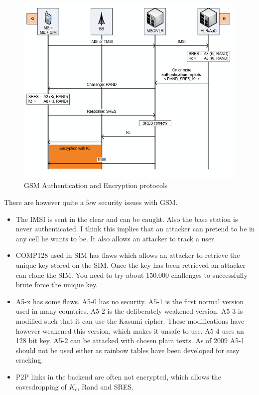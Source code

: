 \documentclass{article}
\begin{document}
\begin{figure}[!h]
\centering
\includegraphics[width=\textwidth, height=\textheight, keepaspectratio]{images/gsm_auth_enc.png}
\caption{GSM Authentication and Encryption protocols}
\label{fig:gsm_auth_enc}
\end{figure}

There are however quite a few security issues with GSM.

\begin{itemize}
\item The IMSI is sent in the clear and can be caught. Also the base station is never authenticated. I think this implies that an attacker can pretend to be in any cell he wants to be. It also allows an attacker to track a user.
\item COMP128 used in SIM has flaws which allows an attacker to retrieve the unique key stored on the SIM. Once the key has been retrieved an attacker can clone the SIM. You need to try about 150.000 challenges to successfully brute force the unique key.
\item A5-x has some flaws. A5-0 has no security. A5-1 is the first normal version used in many countries. A5-2 is the deliberately weakened version. A5-3 is modified such that it can use the Kasumi cipher. These modifications have however weakened this version, which makes it unsafe to use. A5-4 uses an 128 bit key. A5-2 can be attacked with chosen plain texts. As of 2009 A5-1 should not be used either as rainbow tables have been developed for easy cracking.
\item P2P links in the backend are often not encrypted, which allows the eavesdropping of $K_c$, Rand and SRES.
\end{itemize}
\end{document}
